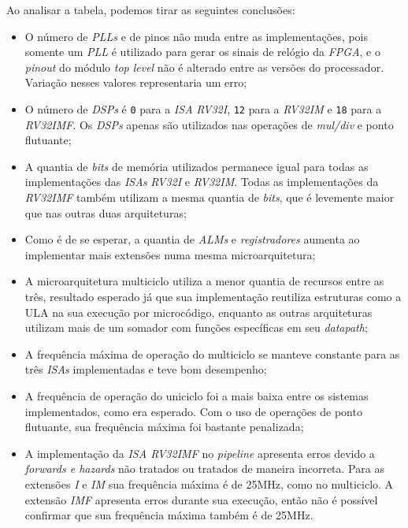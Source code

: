     { Ao analisar a tabela, podemos tirar as seguintes conclusões: }
    \begin{itemize}
        \item   O número de \textit{PLLs} e de pinos não muda entre as implementações,
            pois somente um \textit{PLL} é utilizado para gerar os sinais de relógio da
            \textit{FPGA}, e o \textit{pinout} do módulo \textit{top level} não é alterado
            entre as versões do processador. Variação nesses valores representaria um erro;
        \item   O número de \textit{DSPs} é \texttt{0} para a \textit{ISA} \textit{RV32I},
            \texttt{12} para a \textit{RV32IM} e \texttt{18} para a \textit{RV32IMF}. Os
            \textit{DSPs} apenas são utilizados nas operações de \textit{mul/div} e ponto flutuante;
        \item   A quantia de \textit{bits} de memória utilizados permanece igual para
            todas as implementações das \textit{ISAs} \textit{RV32I} e \textit{RV32IM}.
            Todas as implementações da \textit{RV32IMF} também utilizam a mesma quantia de
            \textit{bits}, que é levemente maior que nas outras duas arquiteturas;
        \item   Como é de se esperar, a quantia de \textit{ALMs} e \textit{registradores}
            aumenta ao implementar mais extensões numa mesma microarquitetura;
        \item   A microarquitetura multiciclo utiliza a menor quantia de recursos entre
            as três, resultado esperado já que sua implementação reutiliza estruturas como
            a ULA na sua execução por microcódigo, enquanto as outras arquiteturas utilizam
            mais de um somador com funções específicas em seu \textit{datapath};
        \item   A frequência máxima de operação do multiciclo se manteve constante para as
            três \textit{ISAs} implementadas e teve bom desempenho;
        \item   A frequência de operação do uniciclo foi a mais baixa entre os sistemas
            implementados, como era esperado. Com o uso de operações de ponto flutuante,
            sua frequência máxima foi bastante penalizada;
        \item   A implementação da \textit{ISA RV32IMF} no \textit{pipeline} apresenta
            erros devido a \textit{forwards e hazards} não tratados ou tratados de maneira
            incorreta. Para as extensões \textit{I} e \textit{IM} sua frequência máxima
            é de 25MHz, como no multiciclo. A extensão \textit{IMF} apresenta erros durante
            sua execução, então não é possível confirmar que sua frequência máxima também é
            de 25MHz.
    \end{itemize}

